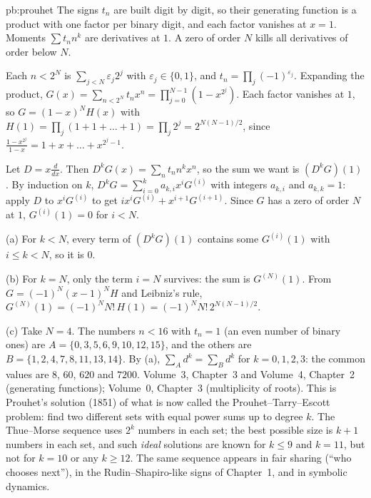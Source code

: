 \begin{solution}{pb:prouhet}
\idea The signs $t_n$ are built digit by digit, so their generating function is a product with one factor per binary
digit, and each factor vanishes at $x=1$. Moments $\sum t_nn^k$ are derivatives at $1$. A zero of order $N$ kills all
derivatives of order below $N$.

\writeup Each $n<2^N$ is $\sum_{j<N}\varepsilon_j2^j$ with $\varepsilon_j\in\{0,1\}$, and $t_n=\prod_j(-1)^{\varepsilon_j}$. Expanding
the product, $G(x)=\sum_{n<2^N}t_nx^n=\prod_{j=0}^{N-1}(1-x^{2^j})$. Each factor vanishes at $1$, so $G=(1-x)^NH(x)$ with
$H(1)=\prod_j(1+1+\dots+1)=\prod_j2^j=2^{N(N-1)/2}$, since $\frac{1-x^{2^j}}{1-x}=1+x+\dots+x^{2^j-1}$.

Let $D=x\frac d{dx}$. Then $D^kG(x)=\sum_nt_nn^kx^n$, so the sum we want is $(D^kG)(1)$. By induction on $k$,
$D^kG=\sum_{i=0}^ka_{k,i}x^iG^{(i)}$ with integers $a_{k,i}$ and $a_{k,k}=1$: apply $D$ to $x^iG^{(i)}$ to get
$ix^iG^{(i)}+x^{i+1}G^{(i+1)}$. Since $G$ has a zero of order $N$ at $1$, $G^{(i)}(1)=0$ for $i<N$.

(a) For $k<N$, every term of $(D^kG)(1)$ contains some $G^{(i)}(1)$ with $i\le k<N$, so it is $0$.

(b) For $k=N$, only the term $i=N$ survives: the sum is $G^{(N)}(1)$. From $G=(-1)^N(x-1)^NH$ and Leibniz's rule,
$G^{(N)}(1)=(-1)^NN!\,H(1)=(-1)^NN!\,2^{N(N-1)/2}$.

(c) Take $N=4$. The numbers $n<16$ with $t_n=1$ (an even number of binary ones) are
$A=\{0,3,5,6,9,10,12,15\}$, and the others are $B=\{1,2,4,7,8,11,13,14\}$. By (a), $\sum_Ad^k=\sum_Bd^k$ for $k=0,1,2,3$:
the common values are $8$, $60$, $620$ and $7200$.
\tools Volume~3, Chapter~3 and Volume~4, Chapter~2 (generating functions); Volume~0, Chapter~3 (multiplicity of roots).
\leads This is Prouhet's solution (1851) of what is now called the Prouhet--Tarry--Escott problem: find two different sets
with equal power sums up to degree $k$. The Thue--Morse sequence uses $2^{k}$ numbers in each set; the best possible size is
$k+1$ numbers in each set, and such \emph{ideal} solutions are known for $k\le9$ and $k=11$, but not for $k=10$ or any $k\ge12$. The same sequence appears in fair sharing (``who chooses next''),
in the Rudin--Shapiro-like signs of Chapter~1, and in symbolic dynamics.
\end{solution}

